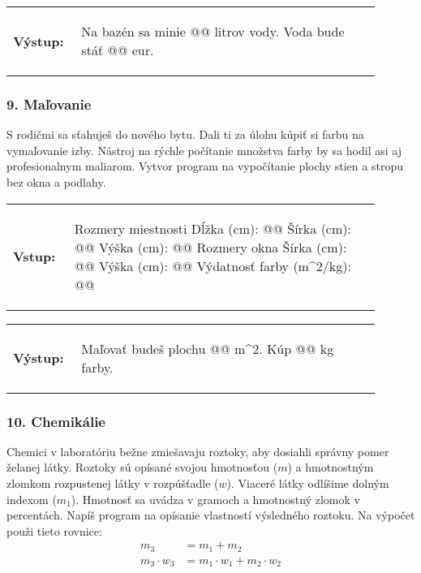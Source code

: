 \vspace{-2em}
\begin{tabular}{@{}p{0.15\linewidth}p{0.75\linewidth}}
\textbf{\small Výstup:} &
\vspace{-3em}
\begin{code}
Na bazén sa minie @\fbox{\phantom{vstup}}@ litrov vody.
Voda bude stáť @\fbox{\phantom{vstup}}@ eur.
\end{code}
\end{tabular}
\vspace{-2em}

\subsubsection*{9. Maľovanie}
S rodičmi sa sťahuješ do nového bytu. Dali ti za úlohu kúpiť si farbu na vymaľovanie izby. Nástroj na rýchle počítanie množstva farby by sa hodil asi aj profesionalnym maliarom. Vytvor program na vypočítanie plochy stien a stropu bez okna a podlahy.

\begin{tabular}{@{}p{0.15\linewidth}p{0.75\linewidth}}
\textbf{\small Vstup:} &
\vspace{-3em}
\begin{code}
Rozmery miestnosti
Dĺžka (cm): @\fbox{\phantom{vstup}}@
Šírka (cm): @\fbox{\phantom{vstup}}@
Výška (cm): @\fbox{\phantom{vstup}}@
Rozmery okna
Šírka (cm): @\fbox{\phantom{vstup}}@
Výška (cm): @\fbox{\phantom{vstup}}@
Výdatnosť farby (m^2/kg): @\fbox{\phantom{vstup}}@
\end{code}
\end{tabular}

\vspace{-2em}
\begin{tabular}{@{}p{0.15\linewidth}p{0.75\linewidth}}
\textbf{\small Výstup:} &
\vspace{-3em}
\begin{code}
Maľovať budeš plochu @\fbox{\phantom{vstup}}@ m^2.
Kúp @\fbox{\phantom{vstup}}@ kg farby.
\end{code}
\end{tabular}
\vspace{-2em}

\subsubsection*{10. Chemikálie}
Chemici v laboratóriu bežne zmiešavaju roztoky, aby dosiahli správny pomer želanej látky. Roztoky sú opísané svojou hmotnosťou ($m$) a hmotnostným zlomkom rozpustenej látky v rozpúšťadle ($w$). Viaceré látky odlíšime dolným indexom ($m_1$).  Hmotnosť sa uvádza v gramoch a hmotnostný zlomok v percentách. Napíš program na opísanie vlastností výsledného roztoku. Na výpočet použi tieto rovnice:
\begin{align*}
m_3 &= m_1 + m_2 \\
m_3 \cdot w_3 &= m_1 \cdot w_1 +  m_2 \cdot w_2
\end{align*}

